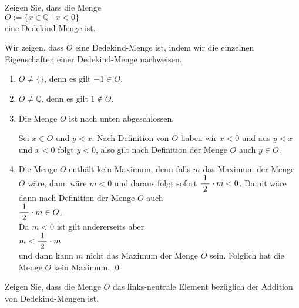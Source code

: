 \exercise
Zeigen Sie, dass die Menge 
\\[0.2cm]
\hspace*{1.3cm}
$O := \{ x \in \mathbb{Q} \mid x < 0 \}$
\\[0.2cm]
eine Dedekind-Menge ist.
\eox

\solution
Wir zeigen, dass $O$ eine Dedekind-Menge ist, indem wir die einzelnen Eigenschaften einer
Dedekind-Menge nachweisen. 
\begin{enumerate}
\item $O \not= \{\}$, denn es gilt $-1 \in O$.
\item $O \not= \mathbb{Q}$, denn es gilt $1 \not\in O$.
\item Die Menge $O$ ist nach unten abgeschlossen.

      Sei $x \in O$ und $y < x$.  Nach Definition von $O$ haben wir
      $x < 0$ und aus $y < x$ und $x < 0$ folgt $y < 0$, also gilt nach Definition der Menge $O$ 
      auch $y \in O$.
\item Die Menge $O$ enth\"alt kein Maximum, denn falls $m$ das Maximum der Menge $O$ w\"are,
      dann w\"are $m < 0$ und daraus folgt sofort $\displaystyle\frac{\;\displaystyle1\;}{\;\displaystyle2\;} \cdot m < 0$.  Damit w\"are dann nach
      Definition der Menge $O$ auch
      \\[0.2cm]
      \hspace*{1.3cm}
      $\displaystyle\frac{\;\displaystyle1\;}{\;\displaystyle2\;} \cdot m \in O$.
      \\[0.2cm]
      Da $m < 0$ ist gilt andererseits aber
      \\[0.2cm]
      \hspace*{1.3cm}
      $m < \displaystyle\frac{\;\displaystyle1\;}{\;\displaystyle2\;} \cdot m$
      \\[0.2cm]
      und dann kann $m$ nicht das Maximum der Menge $O$ sein.   Folglich hat die Menge $O$ kein Maximum.
      \qed
\end{enumerate}
\renewcommand{\labelenumi}{\arabic{enumi}.}
\vspace*{-0.3cm}

\exercise 
Zeigen Sie, dass die Menge $O$ das links-neutrale Element bez\"uglich der Addition von
Dedekind-Mengen ist.  \eox


